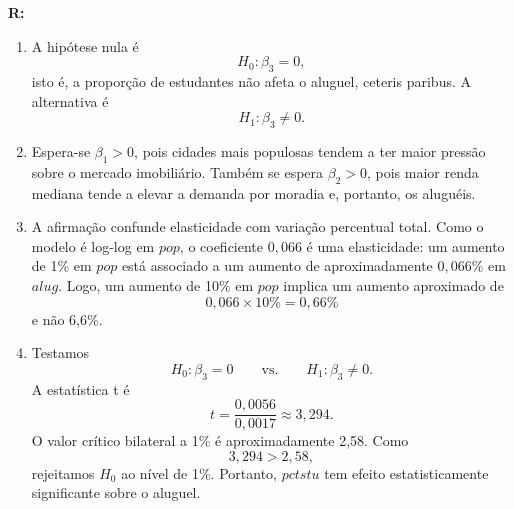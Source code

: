 \documentclass[12pt,letterpaper, onecolumn]{exam}
\renewenvironment{solution}
  {\par\noindent\textbf{R:}\enspace\color{blue}}
  {\par\color{black}}
\begin{document}
\begin{questions}
    \begin{solution}
\begin{enumerate}[label=(\alph*)]
    \item A hipótese nula é
    \[
    H_0:\beta_3=0,
    \]
    isto é, a proporção de estudantes não afeta o aluguel, ceteris paribus. A alternativa é
    \[
    H_1:\beta_3\neq 0.
    \]

    \item Espera-se \(\beta_1>0\), pois cidades mais populosas tendem a ter maior pressão sobre o mercado imobiliário. Também se espera \(\beta_2>0\), pois maior renda mediana tende a elevar a demanda por moradia e, portanto, os aluguéis.

    \item A afirmação confunde elasticidade com variação percentual total. Como o modelo é log-log em \(pop\), o coeficiente \(0,066\) é uma elasticidade: um aumento de 1\% em \(pop\) está associado a um aumento de aproximadamente \(0,066\%\) em \(alug\). Logo, um aumento de 10\% em \(pop\) implica um aumento aproximado de
    \[
    0,066\times 10\%=0,66\%
    \]
    e não 6,6\%.

    \item Testamos
    \[
    H_0:\beta_3=0
    \qquad \text{vs.} \qquad
    H_1:\beta_3\neq 0.
    \]
    A estatística t é
    \[
    t=\frac{0,0056}{0,0017}\approx 3,294.
    \]
    O valor crítico bilateral a 1\% é aproximadamente 2,58. Como
    \[
    3,294>2,58,
    \]
    rejeitamos \(H_0\) ao nível de 1\%. Portanto, \(pctstu\) tem efeito estatisticamente significante sobre o aluguel.
\end{enumerate}
\end{solution}

\
\



\end{questions}
\end{document}

